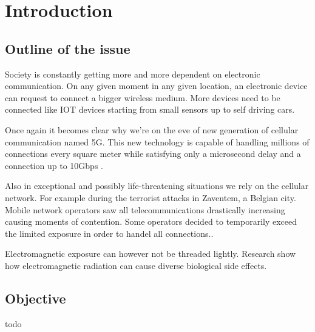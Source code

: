 %

\chapter{Introduction}
\label{chap:intro}

\section{Outline of the issue}
\label{sec:issue}

Society is constantly getting more and more dependent on electronic communication. On any given moment in any given location, an electronic device
can request to connect a bigger wireless medium. More devices need to be connected like IOT devices starting from small sensors up to self driving cars.

Once again it becomes clear why we're on the eve of new generation of cellular communication named 5G. 
This new technology is capable of handling millions of connections every square meter %
while satisfying only a microsecond delay and a connection up to 10Gbps \cite{yang20185g}.

Also in exceptional and possibly life-threatening situations we rely on the cellular network. For example during the terrorist attacks in Zaventem, a Belgian city.
Mobile network operators saw all telecommunications drastically increasing causing moments of contention. Some operators decided to temporarily exceed the limited exposure in
order to handel all connections.. \cite{baseZaventem}

Electromagnetic exposure can however not be threaded lightly. Research show how electromagnetic radiation can cause diverse biological side effects. \cite{bio-effects}

\section{Objective}
\label{sec:objective}

todo